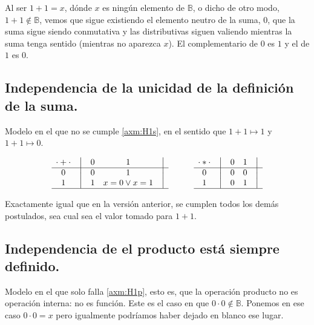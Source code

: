 \documentclass[final,12pt,a4paper,twoside,fleqn]{extbook}
\newcommand{\setB}{\ensuremath{\mathbb{B}}}
\theoremstyle{definition}
\theoremstyle{remark}
\begin{document}
	Al ser \(1 + 1 = x\), dónde \(x\) es ningún elemento de $\setB$, o dicho
de otro modo, \(1 + 1 \notin \setB\), vemos que sigue existiendo el elemento
neutro de la suma, \(0\), que la suma sigue siendo conmutativa y las
distributivas siguen valiendo mientras la suma tenga sentido (mientras no
aparezca \(x\)). El complementario de \(0\) es \(1\) y el de \(1\) es \(0\).



\subsection{Independencia de la unicidad de la definición de la suma.}

Modelo en el que no se cumple \ref{axm:H1s}, en el sentido que \(1 + 1
\mapsto 1\) y \(1 + 1 \mapsto 0\).


\[
    \begin{matrix}
        {\cdot + \cdot} & \big{\vert} & {0} & {1} & \big{\vert} \\
        \hline
        {0}             & \big{\vert} & {0} & {1} & \big{\vert} \\
        {1}             & \big{\vert} & {1} & {x=0 \vee x=1} & \big{\vert} \\
        \hline
    \end{matrix}
    \qquad\qquad
    \begin{matrix}
        {\cdot * \cdot} & \big{\vert} & {0} & {1} & \big{\vert} \\
        \hline
        {0}                   & \big{\vert} & {0} & {0} & \big{\vert} \\
        {1}                   & \big{\vert} & {0} & {1} & \big{\vert} \\
        \hline
    \end{matrix}
\]



Exactamente igual que en la versión anterior, se cumplen todos los demás
postulados, sea cual sea el valor tomado para \(1 + 1\).



\subsection{Independencia de el producto está siempre definido.}



	Modelo en el que solo falla \ref{axm:H1p}, esto es, que la operación
producto no es operación interna: no es función. Este es el caso en que
\( 0 \cdot 0 \notin \setB \). Ponemos en ese caso \(0 \cdot 0 = x\) pero
igualmente podríamos haber dejado en blanco ese lugar.
\end{document}
